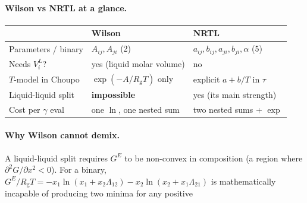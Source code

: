 \documentclass[11pt,a4paper]{article}
\newcommand{\Rgas}{R_{\!\mathrm{g}}}                %
\newcommand{\Gex}{G^{E}}
\begin{document}
\paragraph{Wilson vs NRTL at a glance.}
\begin{center}
\begin{tabular}{lll}
\hline
                       & \textbf{Wilson} & \textbf{NRTL} \\
\hline
Parameters / binary    & $A_{ij},A_{ji}$ (2)        & $a_{ij},b_{ij},a_{ji},b_{ji},\alpha$ (5) \\
Needs $V_i^L$?         & yes (liquid molar volume)  & no \\
$T$-model in Choupo    & $\exp(-A/\Rgas T)$ only     & explicit $a+b/T$ in $\tau$ \\
Liquid-liquid split    & \textbf{impossible}        & yes (its main strength) \\
Cost per $\gamma$ eval & one $\ln$, one nested sum  & two nested sums + $\exp$ \\
\hline
\end{tabular}
\end{center}

\paragraph{Why Wilson cannot demix.}\label{sec:wilson-limit}
A liquid-liquid split requires $\Gex$ to be non-convex in composition
(a region where $\partial^2 G/\partial x^2 < 0$). For a binary,
$\Gex/\Rgas T = -x_1\ln(x_1+x_2\Lambda_{12})-x_2\ln(x_2+x_1\Lambda_{21})$
is mathematically incapable of producing two minima for any positive
\end{document}
